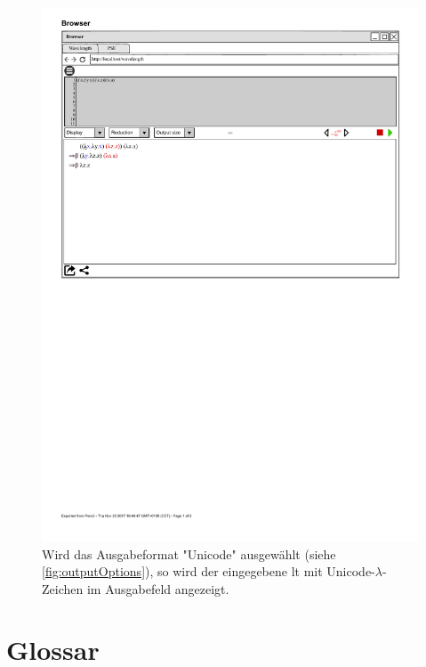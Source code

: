 \documentclass[parskip=full,11pt,twoside]{scrartcl}
\begin{document}
\begin{figure}[H]
	\centering
	\includegraphics[width=\textwidth]{img/Unicode_Darstellunsgmodus}
	\caption{\label{fig:unicode}Wird das Ausgabeformat "Unicode" ausgewählt (siehe \cref{fig:outputOptions}), so wird der eingegebene \gls{lt} mit Unicode-$\lambda$-Zeichen im Ausgabefeld angezeigt.}
\end{figure}

\pagebreak

\section{Glossar}

\printglossaries
\end{document}
